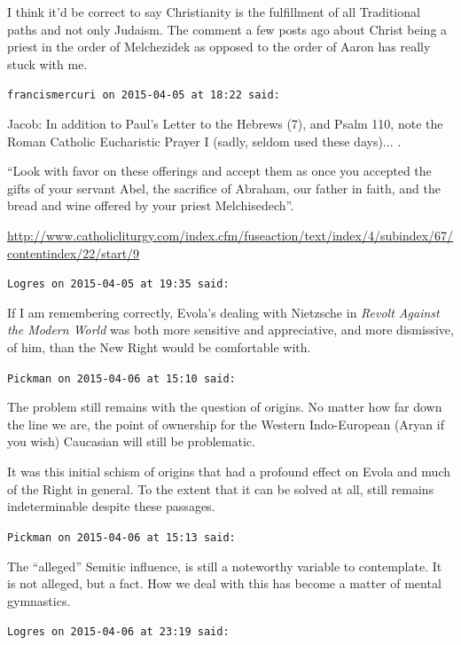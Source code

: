 \begin{footnotesize}
\begin{sffamily}
I think it'd be correct to say Christianity is the fulfillment of all Traditional paths and not only Judaism. The comment a few posts ago about Christ being a priest in the order of Melchezidek as opposed to the order of Aaron has really stuck with me.

\hfill

\texttt{francismercuri on 2015-04-05 at 18:22 said:}

Jacob: In addition to Paul's Letter to the Hebrews (7), and Psalm 110, note the Roman Catholic Eucharistic Prayer I (sadly, seldom used these days)... .

``Look with favor on these offerings and accept them as once you accepted the gifts of your servant Abel, the sacrifice of Abraham, our father in faith, and the bread and wine offered by your priest Melchisedech''.

\url{http://www.catholicliturgy.com/index.cfm/fuseaction/text/index/4/subindex/67/contentindex/22/start/9}


\hfill

\texttt{Logres on 2015-04-05 at 19:35 said:}

If I am remembering correctly, Evola's dealing with Nietzsche in \textit{Revolt Against the Modern World} was both more sensitive and appreciative, and more dismissive, of him, than the New Right would be comfortable with.

\hfill

\texttt{Pickman on 2015-04-06 at 15:10 said:}

The problem still remains with the question of origins. No matter how far down the line we are, the point of ownership for the Western Indo-European (Aryan if you wish) Caucasian will still be problematic.

It was this initial schism of origins that had a profound effect on Evola and much of the Right in general. To the extent that it can be solved at all, still remains indeterminable despite these passages.

\hfill

\texttt{Pickman on 2015-04-06 at 15:13 said:}

The ``alleged'' Semitic influence, is still a noteworthy variable to contemplate. It is not alleged, but a fact. How we deal with this has become a matter of mental gymnastics.

\hfill

\texttt{Logres on 2015-04-06 at 23:19 said:}


\end{sffamily}
\end{footnotesize}
